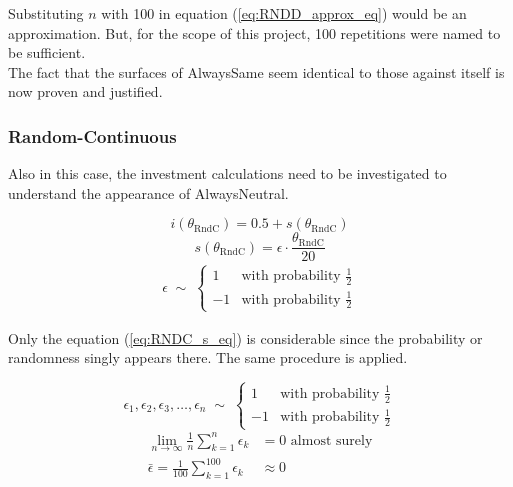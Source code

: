 \documentclass[11pt]{article}
\begin{document}
	Substituting $n$ with 100 in equation (\ref{eq:RNDD_approx_eq}) would be an approximation.
	But, for the scope of this project, 100 repetitions were named to be sufficient.\\
	The fact that the surfaces of AlwaysSame seem identical to those against itself is now proven and justified.
	
\subsubsection*{Random-Continuous}

	Also in this case, the investment calculations need to be investigated to understand the appearance of AlwaysNeutral.

	\begin{equation}
		i(\theta_{\mathrm{RndC}}) = 0.5 + s(\theta_{\mathrm{RndC}})
		\label{eq:RNDC_i_eq}
	\end{equation}
	\begin{equation}
		s(\theta_{\mathrm{RndC}}) = \epsilon \cdot \frac{\theta_{\mathrm{RndC}}}{20}
		\label{eq:RNDC_s_eq}
	\end{equation}
	\begin{equation}
		\begin{split}
		\epsilon \;\sim\;
		\begin{cases}
		  1 & \text{with probability } \frac{1}{2}\\
		 -1 & \text{with probability } \frac{1}{2} 
		\end{cases}
		\label{eq:prob_eps}
		\end{split}
	\end{equation}

	Only the equation (\ref{eq:RNDC_s_eq}) is considerable since the probability or randomness singly appears there.
	The same procedure is applied.

	\begin{equation}
		\epsilon_1, \epsilon_2, \epsilon_3, \dots, \epsilon_n \;\sim\; 
		\begin{cases}
		  1 & \text{with probability } \frac{1}{2}\\
		 -1 & \text{with probability } \frac{1}{2} 
		\end{cases}
		\label{eq:RNDC_n_i}
	\end{equation}
	\begin{equation}
		\begin{split}
			\lim_{n\to\infty} \frac{1}{n} \sum_{k=1}^{n} \epsilon_k &= 0 \text{ almost surely}\\
			\bar \epsilon = \frac{1}{100} \sum_{k=1}^{100} \epsilon_k &\approx 0
		\label{eq:RNDC_approx_eq}
		\end{split}
	\end{equation}
\end{document}
